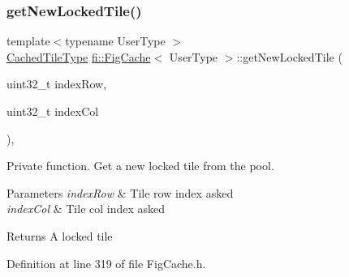 \subsubsection{\texorpdfstring{get\+New\+Locked\+Tile()}{getNewLockedTile()}}
{\footnotesize\ttfamily template$<$typename User\+Type $>$ \\
\hyperlink{classfi_1_1FigCache_a7b9bbc4a832c01c3a461f573445c3c41}{Cached\+Tile\+Type} \hyperlink{classfi_1_1FigCache}{fi\+::\+Fig\+Cache}$<$ User\+Type $>$\+::get\+New\+Locked\+Tile (\begin{DoxyParamCaption}\item[{uint32\+\_\+t}]{index\+Row,  }\item[{uint32\+\_\+t}]{index\+Col }\end{DoxyParamCaption})\hspace{0.3cm}{\ttfamily [inline]}, {\ttfamily [private]}}



Private function. Get a new locked tile from the pool. 


\begin{DoxyParams}{Parameters}
{\em index\+Row} & Tile row index asked \\
\hline
{\em index\+Col} & Tile col index asked \\
\hline
\end{DoxyParams}
\begin{DoxyReturn}{Returns}
A locked tile 
\end{DoxyReturn}


Definition at line 319 of file Fig\+Cache.\+h.

